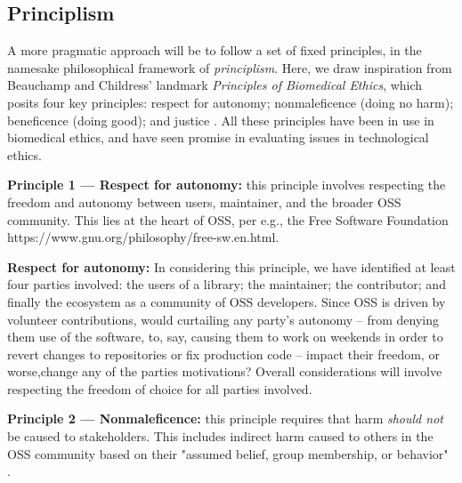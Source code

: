 \documentclass[journal,twocolumn]{IEEEtran}
\begin{document}
\subsection{Principlism}
A more pragmatic approach will be to follow a set of fixed principles, in the namesake philosophical framework of \textit{principlism}. Here, we draw inspiration from Beauchamp and Childress' landmark \textit{Principles of Biomedical Ethics}, which posits four key principles: respect for autonomy; nonmaleficence (doing no harm); beneficence (doing good); and justice \cite{Beauchamp1994}. All these principles have been in use in biomedical ethics, and have seen promise in evaluating issues in technological ethics.

\begin{tcolorbox}
    \textbf{Principle 1 --- Respect for autonomy:} this principle involves respecting the freedom and autonomy between users, maintainer, and the broader OSS community. This lies at the heart of OSS, per e.g., the Free Software Foundation https://www.gnu.org/philosophy/free-sw.en.html. 
\end{tcolorbox}

\textbf{Respect for autonomy:} In considering this principle, we have identified at least four parties involved: the users of a library; the maintainer; the contributor; and finally the ecosystem as a community of OSS developers.
Since OSS is driven by volunteer contributions, would curtailing any party's autonomy -- from denying them use of the software, to, say, causing them to work on weekends in order to revert changes to repositories or fix production code -- impact their freedom, or worse,change any of the parties motivations? Overall considerations will involve respecting the freedom of choice for all parties involved.


\begin{tcolorbox}
    \textbf{Principle 2 --- Nonmaleficence:} this principle requires that harm \textit{should not} be caused to stakeholders. This includes indirect harm caused to others in the OSS community based on their "assumed belief, group membership, or behavior" \cite{coghlan}.
\end{tcolorbox}
\end{document}
